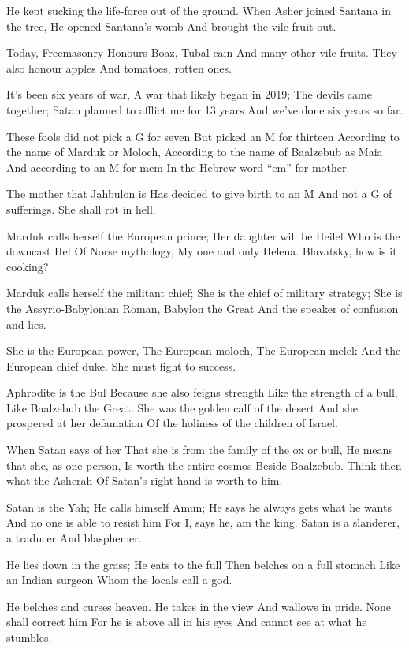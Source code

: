\documentclass[
]{book}
\begin{document}
He kept sucking the life-force out of the ground.
When Asher joined Santana in the tree,
He opened Santana's womb
And brought the vile fruit out.

Today, Freemasonry
Honours Boaz, Tubal-cain
And many other vile fruits.
They also honour apples
And tomatoes, rotten ones.

It's been six years of war,
A war that likely began in 2019;
The devils came together;
Satan planned to afflict me for 13 years
And we've done six years so far.

These fools did not pick a G for seven
But picked an M for thirteen
According to the name of Marduk or Moloch,
According to the name of Baalzebub as Maia
And according to an M for mem
In the Hebrew word ``em'' for mother.

The mother that Jahbulon is
Has decided to give birth to an M
And not a G of sufferings.
She shall rot in hell.

Marduk calls herself the European prince;
Her daughter will be Heilel
Who is the downcast Hel
Of Norse mythology,
My one and only Helena.
Blavatsky, how is it cooking?

Marduk calls herself the militant chief;
She is the chief of military strategy;
She is the Assyrio-Babylonian Roman,
Babylon the Great
And the speaker of confusion and lies.

She is the European power,
The European moloch,
The European melek
And the European chief duke.
She must fight to success.

Aphrodite is the Bul
Because she also feigns strength
Like the strength of a bull,
Like Baalzebub the Great.
She was the golden calf of the desert
And she prospered at her defamation
Of the holiness of the children of Israel.

When Satan says of her
That she is from the family of the ox or bull,
He means that she, as one person,
Is worth the entire cosmos
Beside Baalzebub.
Think then what the Asherah
Of Satan's right hand is worth to him.

Satan is the Yah;
He calls himself Amun;
He says he always gets what he wants
And no one is able to resist him
For I, says he, am the king.
Satan is a slanderer, a traducer
And blasphemer.

He lies down in the grass;
He eats to the full
Then belches on a full stomach
Like an Indian surgeon
Whom the locals call a god.

He belches and curses heaven.
He takes in the view
And wallows in pride.
None shall correct him
For he is above all in his eyes
And cannot see at what he stumbles.
\end{document}
